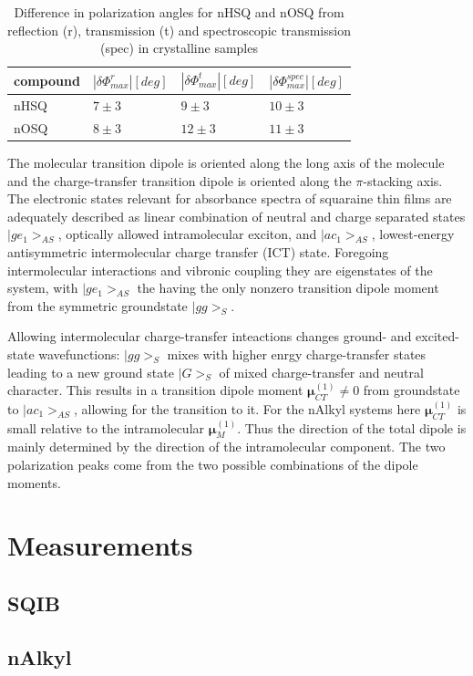 \documentclass{article}
\begin{document}
\begin{multicols}{2}
\begin{table}[H]
\caption{Difference in polarization angles for nHSQ and nOSQ from reflection (r), transmission (t) and spectroscopic transmission (spec) in crystalline samples\cite{Balzer2022}}
\begin{tabular}{l|lll}
compound & $|\delta\Phi^{r}_{max}| [deg]$  & $|\delta\Phi^{t}_{max}| [deg]$  & $|\delta\Phi^{spec}_{max}| [deg]$     \\ \hline
nHSQ     & $7\pm3$ & $9\pm3$  & $10\pm3$ \\
nOSQ     & $8\pm3$ & $12\pm3$ & $11\pm3$
\end{tabular}
\end{table}

The molecular transition dipole is oriented along the long axis of the molecule and the charge-transfer transition dipole is oriented along the $\pi$-stacking axis. \cite{Balzer2022}
The electronic states relevant for absorbance spectra of  squaraine thin films are adequately described as linear combination of neutral and charge separated states $|ge_1>_{AS}$, optically allowed intramolecular exciton, and $|ac_1>_{AS}$, lowest-energy antisymmetric intermolecular charge transfer (ICT) state. Foregoing intermolecular interactions and vibronic coupling they are eigenstates of the system, with $|ge_1>_{AS}$ the having the only nonzero transition dipole moment from the symmetric groundstate $|gg>_S$. \cite{Balzer2022}

Allowing intermolecular charge-transfer inteactions changes ground- and excited- state wavefunctions: $|gg>_S$ mixes  with higher enrgy charge-transfer states leading to a new ground state $|G>_S$ of mixed charge-transfer and neutral character. This results in a transition dipole moment $\mathbf{\mu}^{\left(1\right)}_{CT} \neq 0$ from groundstate to $|ac_1>_{AS}$, allowing for the transition to it. For the nAlkyl systems here $\mathbf{\mu}^{\left(1\right)}_{CT}$ is small relative to the intramolecular $\mathbf{\mu}^{\left(1\right)}_{M}$. Thus the direction of the total dipole is mainly determined by the direction of the intramolecular component. The two polarization peaks come from the two possible combinations of the dipole moments. \cite{Balzer2022}
\newpage

\section{Measurements}
\subsection{SQIB}
\subsection{nAlkyl}


\newpage
\printbibliography
\end{multicols}
\end{document}
